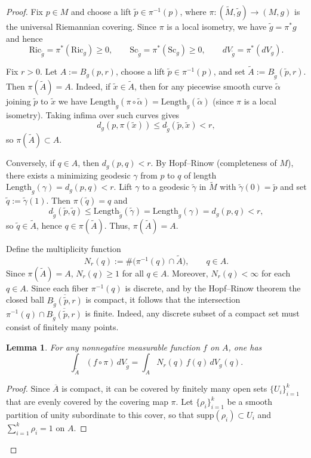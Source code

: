\documentclass[12pt,oneside,a4paper]{article}
\theoremstyle{mytheorem}
\newtheorem{lemma}[definition]{Lemma}
\theoremstyle{remark}
\begin{document}
\begin{proof}
Fix $p\in M$ and choose a lift $\widetilde p\in \pi^{-1}(p)$, where
$\pi:(\widetilde M,\widetilde g)\to (M,g)$ is the universal Riemannian covering.
Since $\pi$ is a local isometry, we have $\widetilde g=\pi^*g$ and hence
\[
\mathrm{Ric}_{\widetilde g}=\pi^*(\mathrm{Ric}_g)\ge 0,
\qquad
\mathrm{Sc}_{\widetilde g}=\pi^*(\mathrm{Sc}_g)\ge 0,
\qquad
dV_{\widetilde g}=\pi^*(dV_g).
\]

Fix $r>0$. Let $A:=B_g(p,r)$, choose a lift $\widetilde p\in \pi^{-1}(p)$, and set
$\widetilde A:=B_{\widetilde g}(\widetilde p,r).$
Then $\pi(\widetilde A)=A.$
Indeed, if $\widetilde x\in \widetilde A$, then for any piecewise smooth curve
$\widetilde\alpha$ joining $\widetilde p$ to $\widetilde x$ we have
$\mathrm{Length}_g(\pi\circ\widetilde\alpha)=\mathrm{Length}_{\widetilde g}(\widetilde\alpha)$
(since $\pi$ is a local isometry). Taking infima over such curves gives
\[
d_g(p,\pi(\widetilde x)) \le d_{\widetilde g}(\widetilde p,\widetilde x) < r,
\]
so $\pi(\widetilde A)\subset A$.

Conversely, if $q\in A$, then $d_g(p,q)<r$. By Hopf--Rinow (completeness of $M$),
there exists a minimizing geodesic $\gamma$ from $p$ to $q$ of length
$\mathrm{Length}_g(\gamma)=d_g(p,q)<r$.
Lift $\gamma$ to a geodesic $\widetilde\gamma$ in $\widetilde M$ with
$\widetilde\gamma(0)=\widetilde p$ and set $\widetilde q:=\widetilde\gamma(1)$.
Then $\pi(\widetilde q)=q$ and
\[
d_{\widetilde g}(\widetilde p,\widetilde q)\le \mathrm{Length}_{\widetilde g}(\widetilde\gamma)
=\mathrm{Length}_g(\gamma)=d_g(p,q)<r,
\]
so $\widetilde q\in \widetilde A$, hence $q\in \pi(\widetilde A)$.
Thus, $\pi(\widetilde A)=A.$

Define the multiplicity function
\[
N_r(q):=\#\bigl(\pi^{-1}(q)\cap \widetilde A\bigr),
\qquad q\in A.
\]
Since $\pi(\widetilde A)=A$, $N_r(q)\ge 1$ for all $q\in A$.
Moreover, $N_r(q)<\infty$ for each $q\in A$. Since each fiber $\pi^{-1}(q)$ is discrete, and by the Hopf--Rinow theorem the closed ball
$\overline{B_{\widetilde g}(\widetilde p,r)}$ is compact, it follows that the intersection
$\pi^{-1}(q)\cap \overline{B_{\widetilde g}(\widetilde p,r)}$ is finite. Indeed, any discrete subset of a compact set must consist of finitely many points.



\begin{lemma}\label{coarea}
For any nonnegative measurable function $f$ on $A$, one has
\[
\int_{\widetilde A} (f\circ \pi)\, dV_{\widetilde g}
=
\int_A N_r(q)\, f(q)\, dV_g(q).
\]
\end{lemma}
\begin{proof}
Since $\overline A$ is compact, it can be covered by finitely many open sets
$\{U_i\}_{i=1}^k$ that are evenly covered by the covering map $\pi$.
Let $\{\rho_i\}_{i=1}^k$ be a smooth partition of unity subordinate to this cover,
so that $\mathrm{supp}(\rho_i)\subset U_i$ and $\sum_{i=1}^k \rho_i =1$ on $A$.


\end{proof}
\end{proof}
\end{document}
